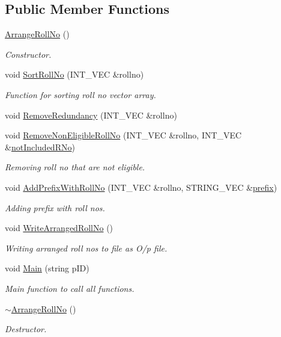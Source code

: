\subsection*{Public Member Functions}
\begin{DoxyCompactItemize}
\item 
\hyperlink{classArrangeRollNo_a430515990d97ffa02b65ed5d15d79c9f}{Arrange\-Roll\-No} ()
\begin{DoxyCompactList}\small\item\em Constructor. \end{DoxyCompactList}\item 
void \hyperlink{classArrangeRollNo_aae9734fb7b98d980d3f1feb1b52a6195}{Sort\-Roll\-No} (I\-N\-T\-\_\-\-V\-E\-C \&rollno)
\begin{DoxyCompactList}\small\item\em Function for sorting roll no vector array. \end{DoxyCompactList}\item 
void \hyperlink{classArrangeRollNo_ab0b6350a9113b86925133d7199929020}{Remove\-Redundancy} (I\-N\-T\-\_\-\-V\-E\-C \&rollno)
\item 
void \hyperlink{classArrangeRollNo_adeb652c1977c668d2cd519c1a4f317bd}{Remove\-Non\-Eligible\-Roll\-No} (I\-N\-T\-\_\-\-V\-E\-C \&rollno, I\-N\-T\-\_\-\-V\-E\-C \&\hyperlink{classArrangeRollNo_a1f6740950e3180731b74c3ecdc19b98c}{not\-Included\-R\-No})
\begin{DoxyCompactList}\small\item\em Removing roll no that are not eligible. \end{DoxyCompactList}\item 
void \hyperlink{classArrangeRollNo_a69151212acbfeb90780b066ade988418}{Add\-Prefix\-With\-Roll\-No} (I\-N\-T\-\_\-\-V\-E\-C \&rollno, S\-T\-R\-I\-N\-G\-\_\-\-V\-E\-C \&\hyperlink{classArrangeRollNo_ac70b1f6e601cc5786ef339a38ae18c6f}{prefix})
\begin{DoxyCompactList}\small\item\em Adding prefix with roll nos. \end{DoxyCompactList}\item 
void \hyperlink{classArrangeRollNo_a12e17989e12519e37083b7f5649ebbec}{Write\-Arranged\-Roll\-No} ()
\begin{DoxyCompactList}\small\item\em Writing arranged roll nos to file as O/p file. \end{DoxyCompactList}\item 
void \hyperlink{classArrangeRollNo_a795fde3b512631e07d7189138b39b775}{Main} (string p\-I\-D)
\begin{DoxyCompactList}\small\item\em Main function to call all functions. \end{DoxyCompactList}\item 
\hyperlink{classArrangeRollNo_acbdaa06590d381ec19a7a07c718b9282}{$\sim$\-Arrange\-Roll\-No} ()
\begin{DoxyCompactList}\small\item\em Destructor. \end{DoxyCompactList}\end{DoxyCompactItemize}
